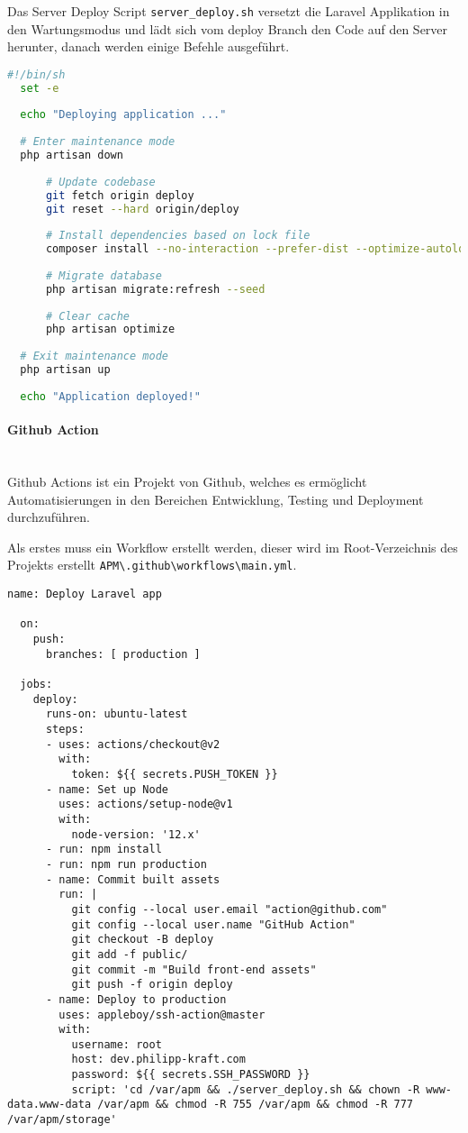 Das Server Deploy Script \verb|server_deploy.sh| versetzt die Laravel Applikation in den Wartungsmodus und lädt sich vom deploy Branch den Code auf den Server herunter, danach werden einige Befehle ausgeführt.

\begin{lstlisting}[language=bash, caption={serverdeploy.sh}]
  #!/bin/sh
  set -e
  
  echo "Deploying application ..."
  
  # Enter maintenance mode
  php artisan down
      
      # Update codebase
      git fetch origin deploy
      git reset --hard origin/deploy
  
      # Install dependencies based on lock file
      composer install --no-interaction --prefer-dist --optimize-autoloader
  
      # Migrate database
      php artisan migrate:refresh --seed
  
      # Clear cache
      php artisan optimize
  
  # Exit maintenance mode
  php artisan up
  
  echo "Application deployed!"
\end{lstlisting}


\paragraph{Github Action}\mbox{}\\
Github Actions ist ein Projekt von Github, welches es ermöglicht Automatisierungen in den Bereichen Entwicklung, Testing und Deployment durchzuführen.

Als erstes muss ein Workflow erstellt werden, dieser wird im Root-Verzeichnis des Projekts erstellt \verb|APM\.github\workflows\main.yml|.

\begin{lstlisting}[caption={main.yml}]
  name: Deploy Laravel app

  on:
    push:
      branches: [ production ]
  
  jobs:
    deploy:
      runs-on: ubuntu-latest
      steps:
      - uses: actions/checkout@v2
        with:
          token: ${{ secrets.PUSH_TOKEN }}
      - name: Set up Node
        uses: actions/setup-node@v1
        with:
          node-version: '12.x'
      - run: npm install
      - run: npm run production
      - name: Commit built assets
        run: |
          git config --local user.email "action@github.com"
          git config --local user.name "GitHub Action"
          git checkout -B deploy
          git add -f public/
          git commit -m "Build front-end assets"
          git push -f origin deploy
      - name: Deploy to production
        uses: appleboy/ssh-action@master
        with:
          username: root
          host: dev.philipp-kraft.com
          password: ${{ secrets.SSH_PASSWORD }}
          script: 'cd /var/apm && ./server_deploy.sh && chown -R www-data.www-data /var/apm && chmod -R 755 /var/apm && chmod -R 777 /var/apm/storage' 
\end{lstlisting}

